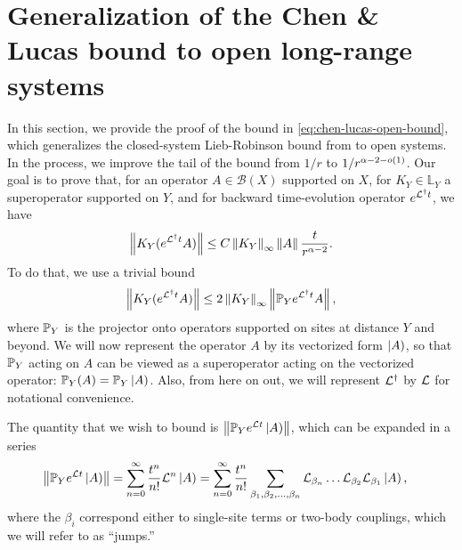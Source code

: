 \section{Generalization of the Chen \& Lucas bound to open long-range systems}
\label{sec:chen-lucas-bound-proof}
In this section, we provide the proof of the bound in \cref{eq:chen-lucas-open-bound}, which generalizes the closed-system Lieb-Robinson bound from \cite{Chen2019} to open systems.
In the process, we improve the tail of the bound from $1/r$ to $1/r^{\alpha-2-o(1)}$.
Our goal is to prove that, for an operator $A\in \mathcal{B}(X)$ supported on $X$, for $K_Y\in \mathbb{L}_Y$ a superoperator supported on $Y$, and for backward time-evolution operator $e^{\mathcal{L}^\dagger t}$, we have
\begin{align}
	\left\|  K_Y(e^{\mathcal{L}^\dagger t} A)\right\| \leq C \left\|K_Y\right\|_{\infty} \left\|A\right\| \frac{t}{r^{\alpha-2}}.
\end{align}
To do that, we use a trivial bound
\begin{align}
    \left\| K_Y(e^{\mathcal{L}^\dagger t} A)\right\| \le 2\left\|K_Y\right\|_{\infty} \left\|\mathbb{P}_Y e^{\mathcal{L}^\dagger t}A\right\|,
\end{align}
where $\mathbb{P}_Y$ is the projector onto operators supported on sites at distance $Y$ and beyond.
We will now represent the operator $A$ by its vectorized form $\left | A \right)$, so that $\mathbb{P}_Y$ acting on $A$ can be viewed as a superoperator acting on the vectorized operator: $\mathbb{P}_Y(A)=\mathbb{P}_Y\left | A \right)$.
Also, from here on out, we will represent $\mathcal{L}^\dagger$ by $\mathcal{L}$ for notational convenience.

The quantity that we wish to bound is $\left\|\mathbb{P}_Y e^{\mathcal{L} t} \left | A \right)\right\|$, which can be expanded in a series
\begin{align}
	\left\|\mathbb{P}_Y e^{\mathcal{L} t} \left | A \right)\right\| &= \sum_{n=0}^\infty \frac{t^n}{n!}\mathcal{L}^n\left | A \right) = \sum_{n=0}^{\infty} \frac{t^n}{n!}\sum_{\beta_1,\beta_2,\dots,\beta_n} \mathcal{L}_{\beta_n}\dots\mathcal{L}_{\beta_2} 	\mathcal{L}_{\beta_1}\left | A \right),
	\label{eq:seriesexpansion}
\end{align}
where the $\beta_i$ correspond either to single-site terms or two-body couplings, which we will refer to as ``jumps.''

